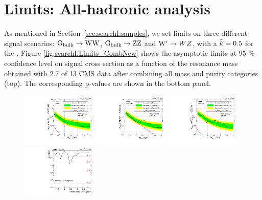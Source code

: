 \section{Limits: All-hadronic analysis}
\label{sec:searchI:results4q}
As mentioned in Section~\ref{sec:searchI:samples}, we set limits on three different signal scenarios: $\mathrm{G}_\mathrm{bulk} \rightarrow \mathrm{W}\mathrm{W}$, $\mathrm{G}_\mathrm{bulk} \rightarrow \mathrm{Z}\mathrm{Z}$ and $\mathrm{W}^\prime \rightarrow WZ$, with a $\tilde{k} = 0.5$ for the \BulkG. Figure \ref{fig:searchI:Limits_CombNew} shows the asymptotic limits at 95 \% confidence level on signal cross section as a function of the resonance mass obtained with 2.7 \fbinv of 13 \TeV CMS data after combining all mass and purity categories (top). The corresponding p-values are shown in the bottom panel.

\begin{figure}[h!]
\centering
\includegraphics[width=0.32\textwidth]{figures/analysis/search1/AN-15-211/limits/brazilianFlag_BulkWW_new_combined_13TeV.pdf}
\includegraphics[width=0.32\textwidth]{figures/analysis/search1/AN-15-211/limits/brazilianFlag_WZ_new_combined_13TeV.pdf}
\includegraphics[width=0.32\textwidth]{figures/analysis/search1/AN-15-211/limits/brazilianFlag_BulkZZ_new_combined_13TeV.pdf}\\
\includegraphics[width=0.32\textwidth]{figures/analysis/search1/AN-15-211/pvalues/pvalue_BulkWWin_combined_new.pdf}

\end{figure}

